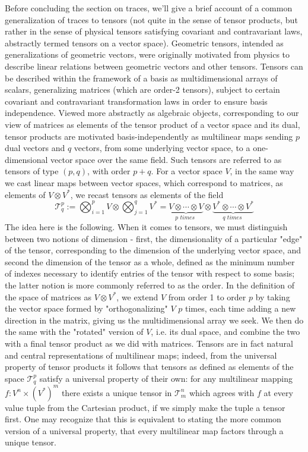 \documentclass{article}
\begin{document}
Before concluding the section on traces, we'll give a brief account of a common generalization of traces to tensors (not quite in the sense of tensor products, but rather in the sense of physical tensors satisfying covariant and contravariant laws, abstractly termed tensors on a vector space). Geometric tensors, intended as generalizations of geometric vectors, were originally motivated from physics to describe linear relations between geometric vectors and other tensors. Tensors can be described within the framework of a basis as multidimensional arrays of scalars, generalizing matrices (which are order-2 tensors), subject to certain covariant and contravariant transformation laws in order to ensure basis independence. Viewed more abstractly as algebraic objects, corresponding to our view of matrices as elements of the tensor product of a vector space and its dual, tensor products are motivated basis-independently as multilinear maps sending $ p $ dual vectors and $ q $ vectors, from some underlying vector space, to a one-dimensional vector space over the same field. Such tensors are referred to as tensors of type $ (p, q) $, with order $ p + q $. For a vector space $ V $, in the same way we cast linear maps between vector spaces, which correspond to matrices, as elements of $ V \otimes V^* $, we recast tensors as elements of the field
    $$ \mathcal{T}_q^p := \bigotimes_{i = 1}^p V \otimes \bigotimes_{j = 1}^q V^* = \underbrace{V \otimes \cdots \otimes V}_{p \textit{ times }} \otimes \underbrace{V^* \otimes \cdots \otimes V^*}_{q \textit{ times }} $$
The idea here is the following. When it comes to tensors, we must distinguish between two notions of dimension - first, the dimensionality of a particular "edge" of the tensor, corresponding to the dimension of the underlying vector space, and second the dimension of the tensor as a whole, defined as the minimum number of indexes necessary to identify entries of the tensor with respect to some basis; the latter notion is more commonly referred to as the order. In the definition of the space of matrices as $ V \otimes V^* $, we extend $ V $ from order 1 to order $ p $ by taking the vector space formed by "orthogonalizing" $ V $ $ p $ times, each time adding a new direction in the matrix, giving us the multidimensional array we seek. We then do the same with the "rotated" version of $ V $, i.e. its dual space, and combine the two with a final tensor product as we did with matrices. Tensors are in fact natural and central representations of multilinear maps; indeed, from the universal property of tensor products it follows that tensors as defined as elements of the space $ \mathcal{T}_q^p $ satisfy a universal property of their own: for any multilinear mapping $ f: V^n \times (V^*)^m $ there exists a unique tensor in $ \mathcal{T}_m^n $ which agrees with $ f $ at every value tuple from the Cartesian product, if we simply make the tuple a tensor first. One may recognize that this is equivalent to stating the more common version of a universal property, that every multilinear map factors through a unique tensor.
\end{document}
